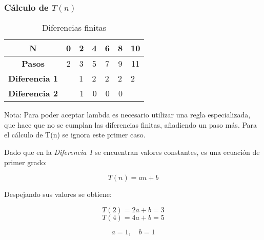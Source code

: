 \documentclass{uc3mpracticas}
\begin{document}
  \subsubsection{Cálculo de $T(n)$}


  \begin{table}[!h]
    \centering
  \begin{tabular}{|c|p{1cm}|p{1cm}|p{1cm}|p{1cm}|p{1cm}|p{1cm}|}
  \hline
  \textbf{N}     & \multicolumn{1}{c|}{\textbf{0}} & \multicolumn{1}{c|}{\textbf{2}} & \multicolumn{1}{c|}{\textbf{4}} & \multicolumn{1}{c|}{\textbf{6}} & \multicolumn{1}{c|}{\textbf{8}} & \multicolumn{1}{c|}{\textbf{10}} \\ \hline
  \textbf{Pasos} & \multicolumn{1}{c|}{2}          & \multicolumn{1}{c|}{3}          & \multicolumn{1}{c|}{5}         & \multicolumn{1}{c|}{7}         & \multicolumn{1}{c|}{9}         & \multicolumn{1}{c|}{11}          \\ \hline
  \textbf{Diferencia 1}                  &                                                         & 1                                                       & 2                               & 2                              & 2                              & 2                               \\ \hline
  \textbf{Diferencia 2}                  &                                                         & \multicolumn{1}{r|}{1}                                  & \multicolumn{1}{r|}{0}          & \multicolumn{1}{r|}{0}          & \multicolumn{1}{r|}{0}          &                                  \\ \hline
  \end{tabular}
  \caption{Diferencias finitas}
  \end{table}

    Nota: Para poder aceptar lambda es necesario utilizar una regla especializada, que hace que no se cumplan las diferencias finitas, añadiendo un paso más. Para el cálculo de T(n) se ignora este primer caso.

    \vspace{2mm}

    Dado que en la \textit{Diferencia 1} se encuentran valores constantes, es una ecuación de primer grado:


    $$ T(n) = an+ b $$

    Despejando sus valores se obtiene:

    $$ T(2) = 2a + b = 3 $$
    $$ T(4) = 4a + b = 5 $$

    $$ a = 1 , \quad b = 1$$
\end{document}
